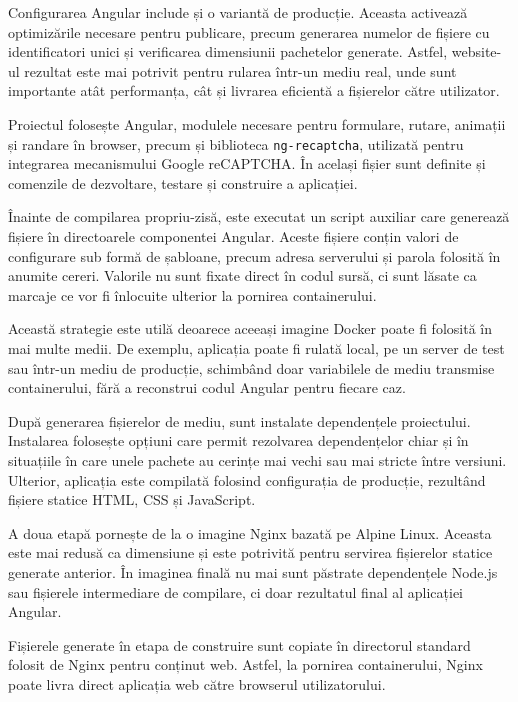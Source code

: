 Configurarea Angular include și o variantă de producție. Aceasta activează optimizările necesare pentru publicare, precum generarea numelor de fișiere cu identificatori unici și verificarea dimensiunii pachetelor generate. Astfel, website-ul rezultat este mai potrivit pentru rularea într-un mediu real, unde sunt importante atât performanța, cât și livrarea eficientă a fișierelor către utilizator.

Proiectul folosește Angular, modulele necesare pentru formulare, rutare, animații și randare în browser, precum și biblioteca \texttt{ng-recaptcha}, utilizată pentru integrarea mecanismului Google reCAPTCHA. În același fișier sunt definite și comenzile de dezvoltare, testare și construire a aplicației.

Înainte de compilarea propriu-zisă, este executat un script auxiliar care generează fișiere în directoarele componentei Angular. Aceste fișiere conțin valori de configurare sub formă de șabloane, precum adresa serverului și parola folosită în anumite cereri. Valorile nu sunt fixate direct în codul sursă, ci sunt lăsate ca marcaje ce vor fi înlocuite ulterior la pornirea containerului.

Această strategie este utilă deoarece aceeași imagine Docker poate fi folosită în mai multe medii. De exemplu, aplicația poate fi rulată local, pe un server de test sau într-un mediu de producție, schimbând doar variabilele de mediu transmise containerului, fără a reconstrui codul Angular pentru fiecare caz.

După generarea fișierelor de mediu, sunt instalate dependențele proiectului. Instalarea folosește opțiuni care permit rezolvarea dependențelor chiar și în situațiile în care unele pachete au cerințe mai vechi sau mai stricte între versiuni. Ulterior, aplicația este compilată folosind configurația de producție, rezultând fișiere statice HTML, CSS și JavaScript.

A doua etapă pornește de la o imagine Nginx bazată pe Alpine Linux. Aceasta este mai redusă ca dimensiune și este potrivită pentru servirea fișierelor statice generate anterior. În imaginea finală nu mai sunt păstrate dependențele Node.js sau fișierele intermediare de compilare, ci doar rezultatul final al aplicației Angular.

Fișierele generate în etapa de construire sunt copiate în directorul standard folosit de Nginx pentru conținut web. Astfel, la pornirea containerului, Nginx poate livra direct aplicația web către browserul utilizatorului.

